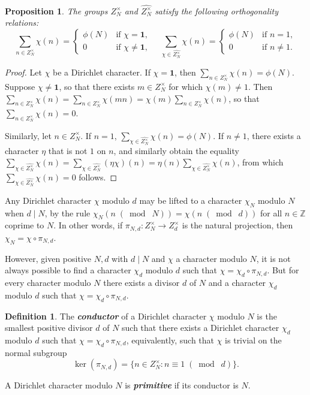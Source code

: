 \documentclass[10pt,leqno,twoside]{article}
\theoremstyle{plain}
\newtheorem{proposition}[lem]{Proposition}
\theoremstyle{definition}
\newtheorem{definition/}[lem]{Definition}
\newenvironment{definition}
  {\renewcommand{\qedsymbol}{\textdagger}%
   \pushQED{\qed}\begin{definition/}}
  {\popQED\end{definition/}}
\numberwithin{equation}{section}
\numberwithin{lem}{section}
\newcommand{\textib}[1]{\textbf{\textit{#1\index{#1}}}} %
\newcommand{\smod}[1]{\;(\bmod\; #1)}
\begin{document}
\begin{proposition}
    The groups $Z_N^\times$ and $\widehat{Z_N^\times}$ satisfy the following orthogonality relations:
\begin{equation}\label{eqn: ortho rels}
    \sum_{n\in Z_N^\times}\chi(n) = \begin{cases}
    \phi(N) & \text{if $\chi = \mathbf 1$}, \\
    0 & \text{if $\chi\neq \mathbf 1$},
\end{cases}\quad \sum_{\chi\in \widehat{Z_N^\times}}\chi(n) = \begin{cases}
    \phi(N) & \text{if $n = 1$}, \\
    0 & \text{if $n\neq 1$}.
\end{cases}
\end{equation}
\end{proposition}

\begin{proof}
    Let $\chi$ be a Dirichlet character. If $\chi= \mathbf 1$, then $\sum_{n\in Z_N^\times}\chi(n) = \phi(N)$. Suppose $\chi\neq \mathbf 1$, so that there exists $m\in Z_N^\times$ for which $\chi(m)\neq 1$. Then $\sum_{n\in Z_N^\times}\chi(n) = \sum_{n\in Z_N^\times}\chi(mn) = \chi(m)\sum_{n\in Z_N^\times}\chi(n)$, so that $\sum_{n\in Z_N^\times}\chi(n) = 0$.

    Similarly, let $n\in Z_N^\times$. If $n = 1$, $\sum_{\chi\in \widehat{Z_N^\times}}\chi(n) = \phi(N)$. If $n\neq 1$, there exists a character $\eta$ that is not $1$ on $n$, and similarly obtain the equality $\sum_{\chi\in \widehat{Z_N^\times}}\chi(n) =\sum_{\chi\in \widehat{Z_N^\times}}(\eta\chi)(n) =\eta(n)\sum_{\chi\in \widehat{Z_N^\times}}\chi(n)$, from which $\sum_{\chi\in \widehat{Z_N^\times}}\chi(n) = 0$ follows.
\end{proof}

Any Dirichlet character $\chi$ modulo $d$ may be lifted to a character $\chi_N$ modulo $N$ when $d\mid N$, by the rule $\chi_N(n\smod N) = \chi(n\smod d)$ for all $n\in\mathbb{Z}$ coprime to $N$. In other words, if $\pi_{N,d}\colon Z_N^\times\to Z_d^\times$ is the natural projection, then $\chi_N = \chi\circ \pi_{N,d}$.

However, given positive $N,d$ with $d\mid N$ and $\chi$ a character modulo $N$, it is not always possible to find a character $\chi_d$ modulo $d$ such that $\chi = \chi_d\circ \pi_{N,d}$. But for every character modulo $N$ there exists a divisor $d$ of $N$ and a character $\chi_d$ modulo $d$ such that $\chi = \chi_d\circ \pi_{N,d}$. 
\begin{definition}
    The \textib{conductor} of a Dirichlet character $\chi$ modulo $N$ is the smallest positive divisor $d$ of $N$ such that there exists a Dirichlet character $\chi_d$ modulo $d$ such that $\chi = \chi_d\circ \pi_{N,d}$, equivalently, such that $\chi$ is trivial on the normal subgroup 
    \[\ker(\pi_{N,d}) = \{n\in Z_N^\times : n\equiv 1\smod d\}.\]

    A Dirichlet character modulo $N$ is \textib{primitive} if its conductor is $N$.
\end{definition}
\end{document}
